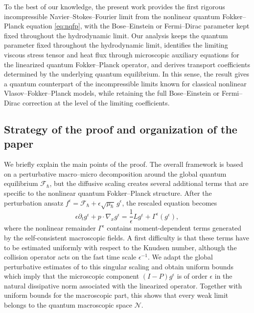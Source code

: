 \documentclass[10pt,reqno]{amsart}
\numberwithin{equation}{section}
\newcommand{\pa}{\partial}
\newcommand{\calF}{\mathcal F}
\newcommand{\calN}{\mathcal N}
\begin{document}
To the best of our knowledge, the present work provides the first rigorous incompressible Navier--Stokes--Fourier limit  from the nonlinear quantum Fokker--Planck equation \eqref{eq:nqfp}, with the Bose--Einstein or Fermi--Dirac parameter kept fixed throughout the hydrodynamic limit. Our analysis keeps the quantum parameter fixed throughout the hydrodynamic limit, identifies the limiting viscous stress tensor and heat flux through microscopic auxiliary equations for the linearized quantum Fokker--Planck operator, and derives transport coefficients determined by the underlying quantum equilibrium. In this sense, the result gives a quantum counterpart of the incompressible limits known for classical nonlinear Vlasov--Fokker--Planck models, while retaining the full Bose--Einstein or Fermi--Dirac correction at the level of the limiting coefficients.

 
%
%
%
%
%
%
%
%
%
%
\subsection{Strategy of the proof and organization of the paper} 

We briefly explain the main points of the proof. The overall framework is based on a perturbative macro--micro decomposition around the global quantum equilibrium $\calF_\hbar$, but the diffusive scaling creates several additional terms that are specific to the nonlinear quantum Fokker--Planck structure. After the perturbation ansatz $f^\epsilon=\calF_\hbar+\epsilon\sqrt{\mu_\hbar}\,g^\epsilon$, the rescaled equation becomes
\[
\epsilon\pa_t g^\epsilon+p\cdot\nabla_x g^\epsilon=\frac{1}{\epsilon}Lg^\epsilon+\Gamma^\epsilon(g^\epsilon),
\]
where the nonlinear remainder $\Gamma^\epsilon$ contains moment-dependent terms generated by the self-consistent macroscopic fields. A first difficulty is that these terms have to be estimated uniformly with respect to the Knudsen number, although the collision operator acts on the fast time scale $\epsilon^{-1}$. We adapt the global perturbative estimates of \cite{CHHpre} to this singular scaling and obtain uniform bounds which imply that the microscopic component $(I-P)g^\epsilon$ is of order $\epsilon$ in the natural dissipative norm associated with the linearized operator. Together with uniform bounds for the macroscopic part, this shows that every weak limit belongs to the quantum macroscopic space $\calN$.
\end{document}
